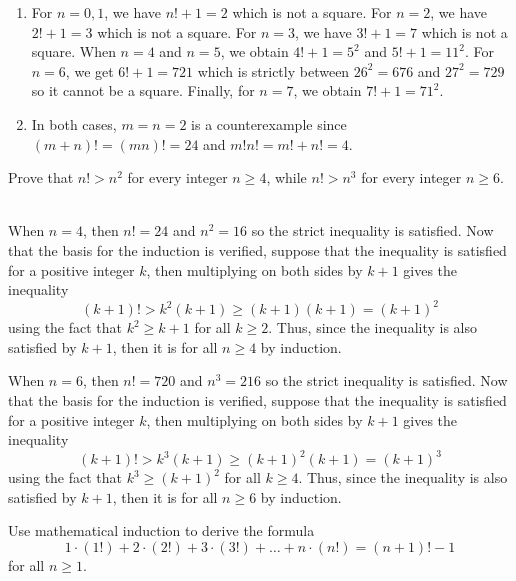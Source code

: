 \begin{solution}
    \begin{enumerate}
        \item For $n = 0, 1$, we have $n! + 1 = 2$ which is not a square. For $n = 2$, we have $2! + 1 = 3$ which is not a square. For $n = 3$, we have $3! + 1 = 7$ which is not a square. When $n = 4$ and $n = 5$, we obtain $4! + 1 = 5^2$ and $5! + 1 = 11^2$. For $n = 6$, we get $6! + 1 = 721$ which is strictly between $26^2 = 676$ and $27^2 = 729$ so it cannot be a square. Finally, for $n = 7$, we obtain $7! + 1 = 71^2$. 
        \item In both cases, $m=n=2$ is a counterexample since $(m+n)! = (mn)! = 24$ and $m!n! = m! + n! = 4$.  \\
    \end{enumerate}
\end{solution}

\begin{exercise}
    Prove that $n! > n^2$ for every integer $n \geq 4$, while $n! > n^3$ for every integer $n \geq 6$. \\
\end{exercise}

\begin{solution}
    \\ When $n = 4$, then $n! = 24$ and $n^2 = 16$ so the strict inequality is satisfied. Now that the basis for the induction is verified, suppose that the inequality is satisfied for a positive integer $k$, then multiplying on both sides by $k+1$ gives the inequality
    $$(k+1)! > k^2(k+1) \geq (k+1)(k+1) = (k+1)^2$$
    using the fact that $k^2 \geq k+1$ for all $k \geq 2$. Thus, since the inequality is also satisfied by $k+1$, then it is for all $n \geq 4$ by induction.

    When $n = 6$, then $n! = 720$ and $n^3 = 216$ so the strict inequality is satisfied. Now that the basis for the induction is verified, suppose that the inequality is satisfied for a positive integer $k$, then multiplying on both sides by $k+1$ gives the inequality
    $$(k+1)! > k^3(k+1) \geq (k+1)^2(k+1) = (k+1)^3$$
    using the fact that $k^3 \geq (k+1)^2$ for all $k \geq 4$. Thus, since the inequality is also satisfied by $k+1$, then it is for all $n \geq 6$ by induction. \\
\end{solution}

\begin{exercise}
    Use mathematical induction to derive the formula
    $$1\cdot (1!) + 2\cdot (2!) + 3\cdot (3!) + \dots + n\cdot (n!) = (n+1)! - 1$$
    for all $n \geq 1$. \\
\end{exercise}

